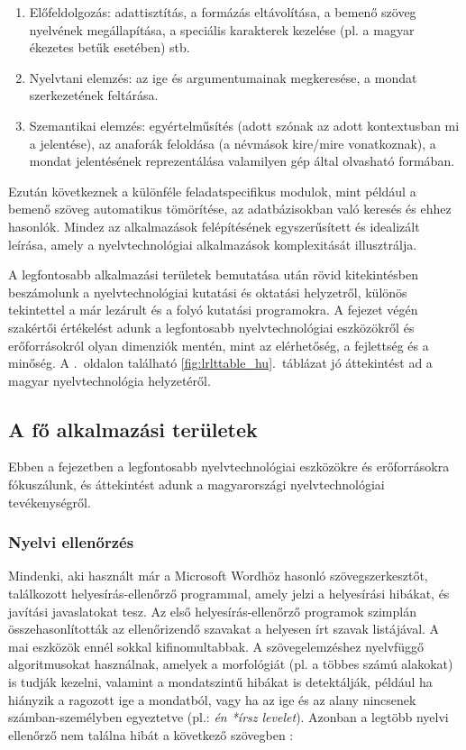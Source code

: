 \begin{multicols}{2}
  \begin{enumerate}
        \item Előfeldolgozás: adattisztítás, a formázás eltávolítása, a bemenő szöveg nyelvének megállapítása, a speciális karakterek kezelése (pl. a magyar ékezetes betűk esetében) stb.
        \item Nyelvtani elemzés: az ige és argumentumainak megkeresése, a mondat szerkezetének feltárása.
        \item Szemantikai elemzés: egy\-ér\-tel\-mű\-sí\-tés (adott szónak az adott kontextusban mi a jelentése), az anaforák feloldása (a névmások kire/mire vonatkoznak), a mondat jelentésének reprezentálása valamilyen gép által olvasható formában. 
      \end{enumerate}

  Ezután következnek a különféle feladatspecifikus modulok, mint például a bemenő szöveg automatikus tömörítése, az adatbázisokban való keresés és ehhez hasonlók. Mindez az alkalmazások fel\-épí\-té\-sé\-nek egyszerűsített és idealizált leírása, amely a nyelvtechnológiai alkalmazások komplexitását illusztrálja.  

  A legfontosabb alkalmazási területek bemutatása után rövid kitekintésben beszámolunk a nyelvtechnológiai kutatási és oktatási helyzetről, különös tekintettel a már lezárult és a folyó kutatási prog\-ra\-mok\-ra. A fejezet végén szakértői értékelést adunk a legfontosabb nyelvtechnológiai esz\-kö\-zök\-ről és erőforrásokról olyan dimenziók mentén, mint az elérhetőség, a fejlettség és a minőség. A \pageref{fig:lrlttable_hu}.~oldalon található \ref{fig:lrlttable_hu}.~táblázat jó áttekintést ad a magyar nyelvtechnológia helyzetéről.

  \subsection{A fő alkalmazási területek} 

  Ebben a fejezetben a legfontosabb nyelv\-tech\-no\-ló\-giai eszközökre és erőforrásokra fókuszálunk, és áttekintést adunk a ma\-gyar\-or\-szá\-gi nyelvtechnológiai te\-vé\-keny\-ség\-ről. 

  \subsubsection{Nyelvi ellenőrzés}

  Mindenki, aki használt már a Microsoft Wordhöz hasonló szövegszerkesztőt, ta\-lál\-ko\-zott helyesírás-ellenőrző programmal, amely jelzi a helyesírási hibákat, és javítási javaslatokat tesz. Az első helyesírás-ellenőrző programok szimplán összehasonlították az ellenőrizendő szavakat a helyesen írt szavak listájával. A mai esz\-kö\-zök ennél sokkal kifinomultabbak. A szövegelemzéshez nyelvfüggő algoritmusokat használnak, amelyek a morfológiát (pl. a többes számú alakokat) is tudják kezelni, valamint a mondatszintű hibákat is detektálják, például ha hiányzik a ragozott ige a mondatból, vagy ha az ige és az alany nincsenek számban-személyben egyeztetve (pl.: \textit{én *írsz levelet}). Azonban a legtöbb nyelvi ellenőrző nem találna hibát a következő szövegben \cite{zar1}:


\end{multicols}
